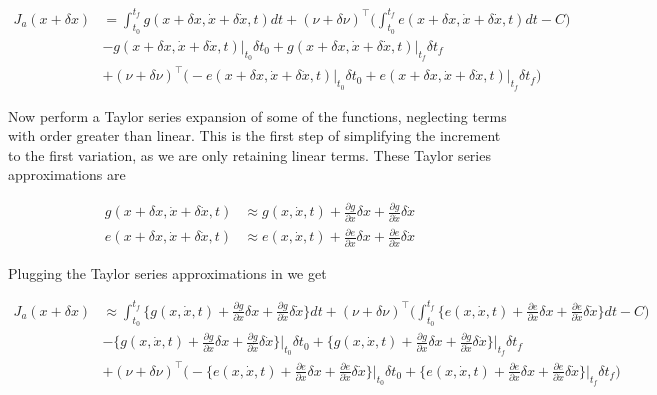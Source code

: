 \documentclass[11pt,letterpaper,onecolumn,notitlepage]{article}
\begin{document}
  \begin{align*}
    J_{a}(x+\delta x)&=
    \int_{t_{0}}^{t_{f}}g(x+\delta x,\dot{x}+\delta\dot{x},t)dt
    +(\nu+\delta\nu)^{\top}\biggr(\int_{t_{0}}^{t_{f}}e(x+\delta x,\dot{x}+\delta\dot{x},t)dt-C\biggr) \\
    &-g(x+\delta x,\dot{x}+\delta\dot{x},t)\bigr|_{t_{0}}\delta t_{0}
    +g(x+\delta x,\dot{x}+\delta\dot{x},t)\bigr|_{t_{f}}\delta t_{f} \\
    &+(\nu+\delta\nu)^{\top}\biggr(
    -e(x+\delta x,\dot{x}+\delta\dot{x},t)\bigr|_{t_{0}}\delta t_{0}
    +e(x+\delta x,\dot{x}+\delta\dot{x},t)\bigr|_{t_{f}}\delta t_{f}
    \biggr)
  \end{align*}

  Now perform a Taylor series expansion of some of the functions, neglecting terms with order greater than linear.
  This is the first step of simplifying the increment to the first variation, as we are only retaining linear terms.
  These Taylor series approximations are

  \begin{align*}
    g(x+\delta x,\dot{x}+\delta\dot{x},t)&\approx g(x,\dot{x},t)+\frac{\partial{}g}{\partial{}x}\delta x+\frac{\partial{}g}{\partial\dot{x}}\delta\dot{x} \\
    e(x+\delta x,\dot{x}+\delta\dot{x},t)&\approx e(x,\dot{x},t)+\frac{\partial{}e}{\partial{}x}\delta x+\frac{\partial{}e}{\partial\dot{x}}\delta\dot{x}
  \end{align*}

  Plugging the Taylor series approximations in we get

  \begin{align*}
    J_{a}(x+\delta x)&\approx
    \int_{t_{0}}^{t_{f}}\biggr\{g(x,\dot{x},t)+\frac{\partial{}g}{\partial{}x}\delta x+\frac{\partial{}g}{\partial\dot{x}}\delta\dot{x}\biggr\}dt
    +(\nu+\delta\nu)^{\top}\biggr(\int_{t_{0}}^{t_{f}}\biggr\{e(x,\dot{x},t)+\frac{\partial{}e}{\partial{}x}\delta x+\frac{\partial{}e}{\partial\dot{x}}\delta\dot{x}\biggr\}dt-C\biggr) \\
    &-\biggr\{g(x,\dot{x},t)+\frac{\partial{}g}{\partial{}x}\delta x+\frac{\partial{}g}{\partial\dot{x}}\delta\dot{x}\biggr\}\biggr|_{t_{0}}\delta t_{0}
    +\biggr\{g(x,\dot{x},t)+\frac{\partial{}g}{\partial{}x}\delta x+\frac{\partial{}g}{\partial\dot{x}}\delta\dot{x}\biggr\}\biggr|_{t_{f}}\delta t_{f} \\
    &+(\nu+\delta\nu)^{\top}\biggr(
    -\biggr\{e(x,\dot{x},t)+\frac{\partial{}e}{\partial{}x}\delta x+\frac{\partial{}e}{\partial\dot{x}}\delta\dot{x}\biggr\}\biggr|_{t_{0}}\delta t_{0}
    +\biggr\{e(x,\dot{x},t)+\frac{\partial{}e}{\partial{}x}\delta x+\frac{\partial{}e}{\partial\dot{x}}\delta\dot{x}\biggr\}\biggr|_{t_{f}}\delta t_{f}
    \biggr)
  \end{align*}
\end{document}
